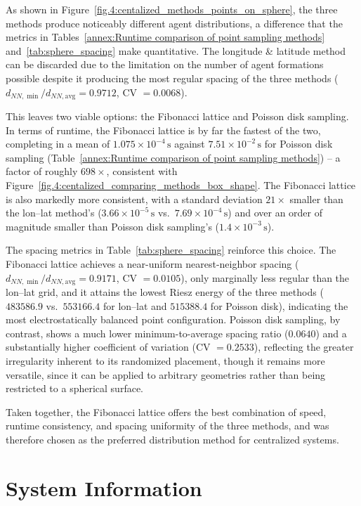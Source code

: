 As shown in Figure~\ref{fig.4:centalized_methods_points_on_sphere}, the three methods produce noticeably different agent distributions, a difference that the metrics in Tables~\ref{annex:Runtime comparison of point sampling methods} and~\ref{tab:sphere_spacing} make quantitative. The longitude \& latitude method can be discarded due to the limitation on the number of agent formations possible despite it producing the most regular spacing of the three methods ($d_{NN,\min}/d_{NN,\text{avg}} = 0.9712$, CV $= 0.0068$).

This leaves two viable options: the Fibonacci lattice and Poisson disk sampling. In terms of runtime, the Fibonacci lattice is by far the fastest of the two, completing in a mean of $1.075\times10^{-4}\,\text{s}$ against $7.51\times10^{-2}\,\text{s}$ for Poisson disk sampling (Table~\ref{annex:Runtime comparison of point sampling methods}) -- a factor of roughly $698\times$, consistent with Figure~\ref{fig.4:centalized_comparing_methods_box_shape}. The Fibonacci lattice is also markedly more consistent, with a standard deviation $21\times$ smaller than the lon--lat method's ($3.66\times10^{-5}\,\text{s}$ vs.\ $7.69\times10^{-4}\,\text{s}$) and over an order of magnitude smaller than Poisson disk sampling's ($1.4\times10^{-3}\,\text{s}$).

The spacing metrics in Table~\ref{tab:sphere_spacing} reinforce this choice. The Fibonacci lattice achieves a near-uniform nearest-neighbor spacing ($d_{NN,\min}/d_{NN,\text{avg}} = 0.9171$, CV $= 0.0105$), only marginally less regular than the lon--lat grid, and it attains the lowest Riesz energy of the three methods ($483586.9$ vs.\ $553166.4$ for lon--lat and $515388.4$ for Poisson disk), indicating the most electrostatically balanced point configuration. Poisson disk sampling, by contrast, shows a much lower minimum-to-average spacing ratio ($0.0640$) and a substantially higher coefficient of variation (CV $= 0.2533$), reflecting the greater irregularity inherent to its randomized placement, though it remains more versatile, since it can be applied to arbitrary geometries rather than being restricted to a spherical surface.

Taken together, the Fibonacci lattice offers the best combination of speed, runtime consistency, and spacing uniformity of the three methods, and was therefore chosen as the preferred distribution method for centralized systems.

\section{System Information} \label{appendix:Computer Specifications}

